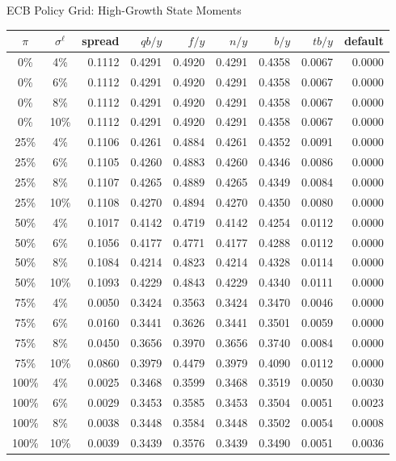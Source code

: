 \begin{frame}{ECB Policy Grid: High-Growth State Moments}
\fontsize{6.5pt}{7.2pt}\selectfont
\centering
\begin{tabular}{ccrrrrrrr}
\toprule
$\pi$ & $\sigma^\ell$ & spread & $qb/y$ & $f/y$ & $n/y$ & $b/y$ & $tb/y$ & default \\
\midrule
0\%   & 4\%  & 0.1112 & 0.4291 & 0.4920 & 0.4291 & 0.4358 & 0.0067 & 0.0000 \\
0\%   & 6\%  & 0.1112 & 0.4291 & 0.4920 & 0.4291 & 0.4358 & 0.0067 & 0.0000 \\
0\%   & 8\%  & 0.1112 & 0.4291 & 0.4920 & 0.4291 & 0.4358 & 0.0067 & 0.0000 \\
0\%   & 10\% & 0.1112 & 0.4291 & 0.4920 & 0.4291 & 0.4358 & 0.0067 & 0.0000 \\
\midrule
25\%  & 4\%  & 0.1106 & 0.4261 & 0.4884 & 0.4261 & 0.4352 & 0.0091 & 0.0000 \\
25\%  & 6\%  & 0.1105 & 0.4260 & 0.4883 & 0.4260 & 0.4346 & 0.0086 & 0.0000 \\
25\%  & 8\%  & 0.1107 & 0.4265 & 0.4889 & 0.4265 & 0.4349 & 0.0084 & 0.0000 \\
25\%  & 10\% & 0.1108 & 0.4270 & 0.4894 & 0.4270 & 0.4350 & 0.0080 & 0.0000 \\
\midrule
50\%  & 4\%  & 0.1017 & 0.4142 & 0.4719 & 0.4142 & 0.4254 & 0.0112 & 0.0000 \\
50\%  & 6\%  & 0.1056 & 0.4177 & 0.4771 & 0.4177 & 0.4288 & 0.0112 & 0.0000 \\
50\%  & 8\%  & 0.1084 & 0.4214 & 0.4823 & 0.4214 & 0.4328 & 0.0114 & 0.0000 \\
50\%  & 10\% & 0.1093 & 0.4229 & 0.4843 & 0.4229 & 0.4340 & 0.0111 & 0.0000 \\
\midrule
75\%  & 4\%  & 0.0050 & 0.3424 & 0.3563 & 0.3424 & 0.3470 & 0.0046 & 0.0000 \\
75\%  & 6\%  & 0.0160 & 0.3441 & 0.3626 & 0.3441 & 0.3501 & 0.0059 & 0.0000 \\
75\%  & 8\%  & 0.0450 & 0.3656 & 0.3970 & 0.3656 & 0.3740 & 0.0084 & 0.0000 \\
75\%  & 10\% & 0.0860 & 0.3979 & 0.4479 & 0.3979 & 0.4090 & 0.0112 & 0.0000 \\
\midrule
100\% & 4\%  & 0.0025 & 0.3468 & 0.3599 & 0.3468 & 0.3519 & 0.0050 & 0.0030 \\
100\% & 6\%  & 0.0029 & 0.3453 & 0.3585 & 0.3453 & 0.3504 & 0.0051 & 0.0023 \\
100\% & 8\%  & 0.0038 & 0.3448 & 0.3584 & 0.3448 & 0.3502 & 0.0054 & 0.0008 \\
100\% & 10\% & 0.0039 & 0.3439 & 0.3576 & 0.3439 & 0.3490 & 0.0051 & 0.0036 \\
\bottomrule
\end{tabular}
\end{frame}

